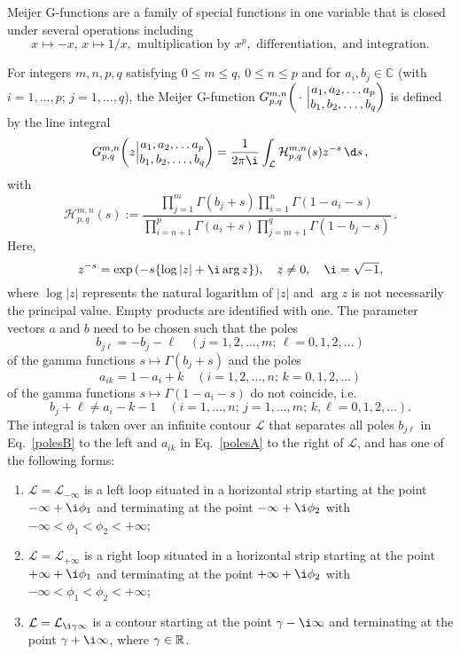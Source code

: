 Meijer G-functions are a family of special functions in one variable that is closed under several operations including
\[
  x \mapsto -x, \,
  x \mapsto 1/x,
  \text{ multiplication by } x^p,
  \text{ differentiation},
  \text{ and integration}.
\]
%
\begin{definition}\label{Def:MeijerG}
  For integers $m,n,p,q$ satisfying $0\leq m \leq q$, $0 \leq n \leq p$ and for $a_i, b_j \in \mathbb{C}$ (with $i=1,\ldots,p$; $j=1,\ldots,q$), the Meijer G-function
  $G_{p,q}^{m,n}{\left(\, \cdot \,\, \Big| \begin{matrix} a_1,a_2, \ldots a_p \\ b_1, b_2,\ldots, b_q\end{matrix}\right)}$ is defined by the line integral
  \[
    \label{eq:the_G}
    G_{p,q}^{m,n}\roundbra{z \Big| \begin{matrix} a_1,a_2, \ldots a_p \\ b_1, b_2,\ldots, b_q\end{matrix}}
    =
    \frac{1}{2\pi \i} \int_{\mathcal{L}} \mathcal{H}_{p,q}^{m,n} (s) z^{-s} \, \d s \, ,
  \]
  with
  \[\label{Hmnpq}
    \mathcal{H}_{p,q}^{m,n}(s) :=   \frac{\prod_{j=1}^m \Gamma(b_j+s) \prod_{i=1}^n \Gamma(1-a_i-s)}{\prod_{i=n+1}^p \Gamma(a_i+s) \prod_{j=m+1}^q \Gamma(1-b_j-s)}
    \,.
  \]
  Here,
  \[
    z^{-s}=\exp\roundbra{-s \curlybra{\log |z|+ \i \arg z}}, \quad z \neq 0, \quad \i=\sqrt{-1},
  \]
  where $\log|z|$ represents the natural logarithm of $|z|$ and $\arg z$ is not necessarily the principal value.
  Empty products are identified with one.
  The parameter vectors $a$ and $b$ need to be chosen such that the poles
  \[\label{polesB}
    b_{j\ell} = -b_j - \ell \quad (j=1,2,\ldots,m;\, \ell=0,1,2,\ldots)
  \]
  of the gamma functions $s\mapsto \Gamma(b_j+s)$ and the poles
  \[\label{polesA}
    a_{ik} = 1-a_i+k \quad (i=1,2,\ldots,n;\, k=0,1,2,\ldots)
  \]
  of the gamma functions $s\mapsto \Gamma(1-a_i-s)$ do not coincide, i.e.
  \[
    b_j+\ell \neq a_i-k-1 \quad (i=1,\ldots,n;\, j=1,\ldots,m;\,  k,\ell=0,1,2,\ldots).
  \]
  The integral is taken over an infinite contour $\mathcal{L}$ that separates all  poles $b_{j\ell}$ in Eq.~\eqref{polesB} to the left and $a_{ik}$ in Eq.~\eqref{polesA} to the right of $\mathcal{L}$, and has one of the following forms:
  \begin{enumerate}
    \item $\mathcal{L}=\mathcal{L}_{-\infty}$ is a left loop situated in a horizontal strip starting at the point $-\infty+\i \phi_1$ and terminating at the point $-\infty + \i \phi_2$ with $-\infty < \phi_1 < \phi_2 < +\infty$;
    \item $\mathcal{L}=\mathcal{L}_{+\infty}$ is a right loop situated in a horizontal strip starting at the point $+\infty+\i \phi_1$ and terminating at the point $+\infty + \i \phi_2$ with $-\infty < \phi_1 < \phi_2 < +\infty$;
    \item $\mathcal{L}=\mathcal{L}_{\i \gamma \infty}$ is a contour starting at the point $\gamma-\i \infty$ and terminating at the point $\gamma+\i \infty$, where $\gamma \in {\mathbb{R}}$.
  \end{enumerate}
\end{definition}
